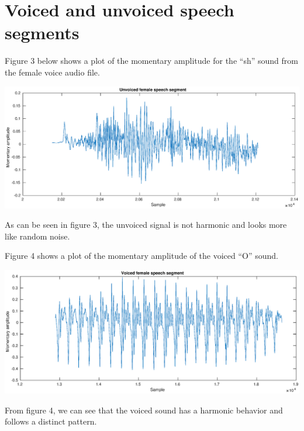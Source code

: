 \documentclass[]{article}
\let\origfigure\figure
\let\endorigfigure\endfigure
\renewenvironment{figure}[1][2] {
    \expandafter\origfigure\expandafter[H]
} {
    \endorigfigure
}
\begin{document}
\newpage

\section{Voiced and unvoiced speech
segments}\label{voiced-and-unvoiced-speech-segments}

Figure 3 below shows a plot of the momentary amplitude for the ``sh''
sound from the female voice audio file.

\begin{figure}
\centering
\includegraphics{Result_Pics/female_music_waveform_unvoiced_segment.eps}
\caption{Visualization of unvoiced segment from female voice sound file}
\end{figure}

As can be seen in figure 3, the unvoiced signal is not harmonic and
looks more like random noise.

Figure 4 shows a plot of the momentary amplitude of the voiced ``O''
sound.

\begin{figure}
\centering
\includegraphics{Result_Pics/female_music_waveform_voiced_segment.eps}
\caption{Visualization of voiced speech segment from female voice sound
file}
\end{figure}

From figure 4, we can see that the voiced sound has a harmonic behavior
and follows a distinct pattern.
\end{document}
